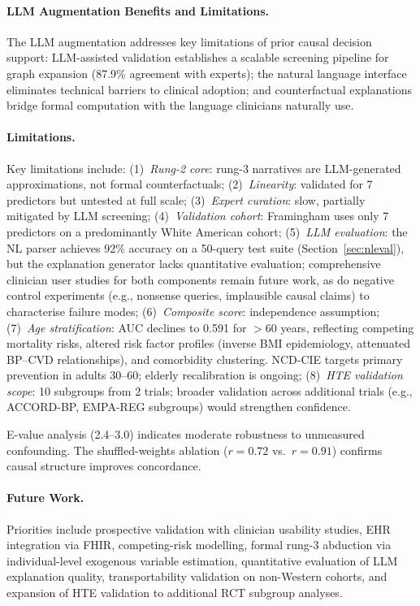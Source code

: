 \documentclass[runningheads]{llncs}
\begin{document}
\paragraph{LLM Augmentation Benefits and Limitations.}
The LLM augmentation addresses key limitations of prior causal
decision support: LLM-assisted validation establishes a scalable
screening pipeline for graph expansion (87.9\% agreement with experts);
the natural language interface eliminates technical barriers to
clinical adoption; and counterfactual explanations bridge formal
computation with the language clinicians naturally use.

\paragraph{Limitations.}
Key limitations include:
(1)~\emph{Rung-2 core}: rung-3 narratives are LLM-generated
approximations, not formal counterfactuals;
(2)~\emph{Linearity}: validated for 7 predictors but untested at
full scale;
(3)~\emph{Expert curation}: slow, partially mitigated by LLM screening;
(4)~\emph{Validation cohort}: Framingham uses only 7 predictors on a
predominantly White American cohort;
(5)~\emph{LLM evaluation}: the NL parser achieves 92\% accuracy on
a 50-query test suite (Section~\ref{sec:nleval}), but the
explanation generator lacks quantitative evaluation;
comprehensive clinician user studies for both components remain
future work, as do negative control experiments (e.g., nonsense
queries, implausible causal claims) to characterise failure modes;
(6)~\emph{Composite score}: independence assumption;
(7)~\emph{Age stratification}: AUC declines to 0.591 for $>$60 years,
reflecting competing mortality risks, altered risk factor profiles
(inverse BMI epidemiology, attenuated BP--CVD relationships), and
comorbidity clustering.
NCD-CIE targets primary prevention in adults 30--60; elderly
recalibration is ongoing;
(8)~\emph{HTE validation scope}: 10 subgroups from 2 trials; broader
validation across additional trials (e.g., ACCORD-BP, EMPA-REG
subgroups) would strengthen confidence.

E-value analysis (2.4--3.0) indicates moderate robustness to
unmeasured confounding.
The shuffled-weights ablation ($r = 0.72$ vs.\ $r = 0.91$)
confirms causal structure improves concordance.

\paragraph{Future Work.}
Priorities include prospective validation with clinician usability
studies, EHR integration via FHIR, competing-risk modelling,
formal rung-3 abduction via individual-level exogenous variable
estimation, quantitative evaluation of LLM explanation quality,
transportability validation on non-Western cohorts, and expansion
of HTE validation to additional RCT subgroup analyses.
\end{document}
